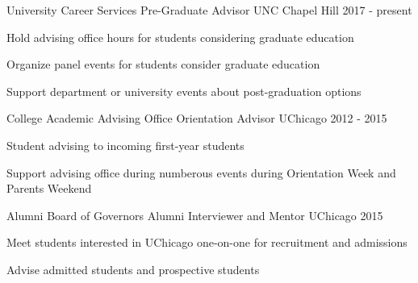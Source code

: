 
\begin{cventries}
  \cventry
    {University Career Services} %
    {Pre-Graduate Advisor} %
    {UNC Chapel Hill} %
    {2017 - present} %
    {
      \begin{cvitems} %
        \item {Hold advising office hours for students considering graduate education}
        \item {Organize panel events for students consider graduate education}
        \item {Support department or university events about post-graduation options}
      \end{cvitems}
    }

  \cventry
    {College Academic Advising Office} %
    {Orientation Advisor} %
    {UChicago} %
    {2012 - 2015} %
    {
      \begin{cvitems} %
        \item {Student advising to incoming first-year students}
        \item {Support advising office during numberous events during Orientation Week and Parents Weekend}
      \end{cvitems}
    }

  \cventry
    {Alumni Board of Governors} %
    {Alumni Interviewer and Mentor} %
    {UChicago} %
    {2015} %
    {
      \begin{cvitems} %
        \item {Meet students interested in UChicago one-on-one for recruitment and admissions}
        \item {Advise admitted students and prospective students}
      \end{cvitems}
    }

\end{cventries}
